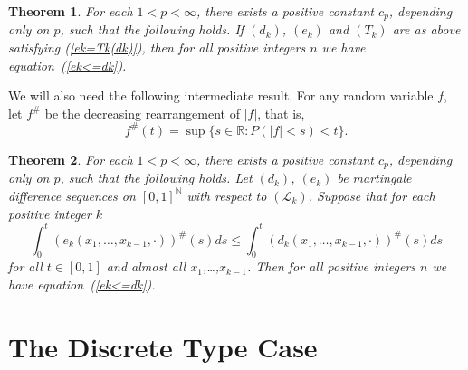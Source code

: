 \documentclass[12pt]{amsart}
\newtheorem{thm}{Theorem}
\begin{document}
\begin{thm}
\label{t ek<=dk T}
For each $1<p<\infty$, there exists a positive constant $c_p$,
depending only on $p$, such
that the following holds.
If $(d_k)$, $(e_k)$ and $(T_k)$ are as above satisfying (\ref{ek=Tk(dk)}),
then for all positive integers $n$ we have
equation~(\ref{ek<=dk}).
\end{thm}

We will also need the following intermediate result.
For any random variable $f$,
let $f^{\#}$ be the decreasing rearrangement of $|f|$, that is,
\[f^{\#}(t)=\sup\{ s\in \mathbb{R}: P(|f|<s)<t\}.\]

\begin{thm}
\label{t ek<=dk sharp} For each $1<p<\infty$, there exists a
positive constant $c_p$, depending only on $p$, such that the
following holds. Let $(d_k)$, $(e_k)$ be martingale difference
sequences on $[0,1]^\mathbb{N}$ with respect to $(\mathcal{L}_k)$.
Suppose that for each positive integer $k$
\[\int_0^t (e_k(x_1,\dots,x_{k-1},\cdot))^{\#}(s)ds
\leq \int_0^t  (d_k(x_1,\dots,x_{k-1},\cdot))^{\#}(s)ds\] for all
$t\in [0,1]$ and almost all $x_1$,\dots,$x_{k-1}$. Then for all
positive integers $n$ we have equation~(\ref{ek<=dk}).
\end{thm}

\section{The Discrete Type Case}
\end{document}
